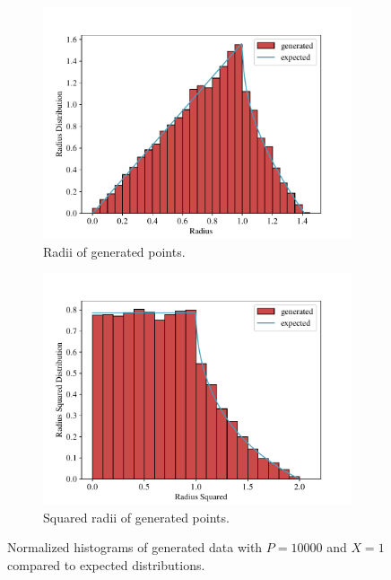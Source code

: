 \begin{figure}[h]
    \centering
    \begin{subfigure}{.45\linewidth}
        \centering
        \includegraphics[width=\linewidth]{figs/ex1.1_radii_hist.pdf}
        \caption{Radii of generated points.}
        \label{fig:radii_hist}
    \end{subfigure}
    \hfill
    \begin{subfigure}{.45\linewidth}
        \centering
        \includegraphics[width=\linewidth]{figs/ex1.1_radii_squared_hist.pdf}
        \caption{Squared radii of generated points.}
        \label{fig:radii_squared_hist}
    \end{subfigure}
    \caption{Normalized histograms of generated data with $P=\num{10000}$ 
    and $X = 1$ compared to expected distributions.}

\end{figure}
